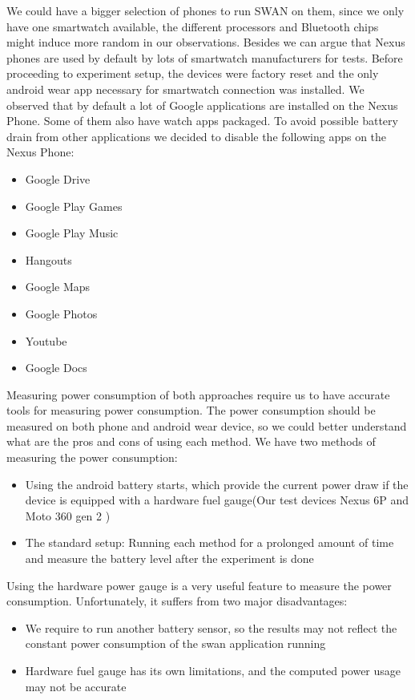  We could have a bigger selection of phones to run SWAN on them, since we only have one smartwatch available,
 the different processors  and Bluetooth chips might induce more random in our observations.
 Besides we can argue that Nexus phones are used by default by lots of smartwatch manufacturers for tests.
 Before proceeding to experiment setup, the devices were factory reset and the only android wear app necessary for smartwatch connection was installed.
 We observed that by default a lot of Google applications are installed on the Nexus Phone. Some of them also have watch apps packaged.
 To avoid possible battery drain from other applications we decided to disable the following apps on the Nexus Phone:
 \begin{itemize}
  \item  Google Drive
  \item Google Play Games
  \item Google Play Music
  \item Hangouts
  \item Google Maps
  \item Google Photos
  \item Youtube
  \item Google Docs
 \end{itemize}

 Measuring power consumption of both approaches require us to have accurate tools for measuring power consumption.
 The power consumption should be measured on both phone and android wear device, so we could better understand what are the pros and cons of using each method.
 We have two methods of measuring the power consumption:
 \begin{itemize}
  \item Using the android battery starts, which provide the current power draw if the device is equipped with a hardware fuel gauge(Our test devices Nexus 6P and Moto 360 gen 2 )\cite{fuel_gauge}
  \item The standard setup: Running each method for a prolonged amount of time and measure the battery level after the experiment is done
 \end{itemize}

 Using the hardware power gauge is a very useful feature to measure the power consumption. Unfortunately, it suffers from two major disadvantages:
 \begin{itemize}
  \item We require to run another battery sensor, so the results may not reflect the constant power consumption of the swan application running
  \item Hardware fuel gauge has its own limitations, and the computed power usage may not be accurate
 \end{itemize}

